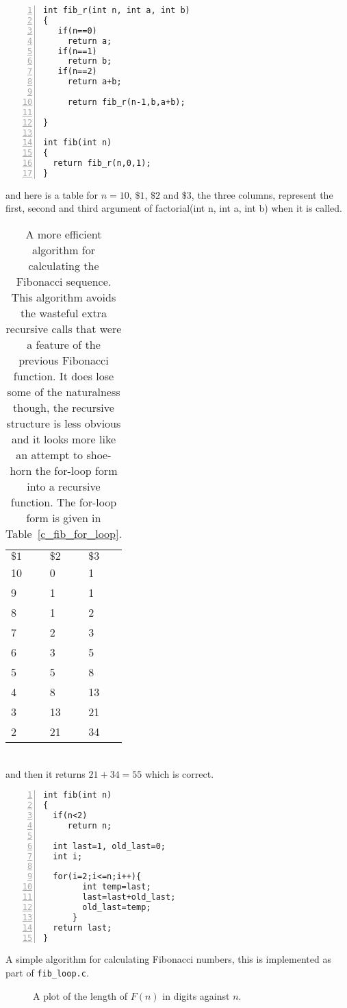 \documentclass[11pt,a4paper]{scrartcl}
\begin{document}
\begin{table}
\begin{lstlisting}[numbers=left]
int fib_r(int n, int a, int b)
{
   if(n==0)
     return a;
   if(n==1)
     return b;
   if(n==2)
     return a+b;
     
     return fib_r(n-1,b,a+b);

}

int fib(int n)
{
  return fib_r(n,0,1);
}
\end{lstlisting}
and here is a table for $n=10$, $\$1$, $\$2$ and $\$3$, the three
columns, represent the first, second and third argument of
factorial(int n, int a, int b) when it is called.\\
\begin{tabular}{l|ll}
$\$1$&$\$2$&$\$3$\\
10&0&1\\
9 &1&1\\
8 &1&2\\
7 &2&3\\
6 &3&5\\
5 &5&8\\
4 &8&13\\
3 &13&21\\
2 &21&34\\
\end{tabular}\\
and then it returns $21+34=55$ which is correct.
\caption{A more efficient algorithm for calculating the Fibonacci
  sequence. This algorithm avoids the wasteful extra recursive calls
  that were a feature of the previous Fibonacci function. It does
  lose some of the naturalness though, the recursive structure is
  less obvious and it looks more like an attempt to shoe-horn the
  for-loop form into a recursive function. The for-loop form is given
  in Table~\ref{c_fib_for_loop}. \label{c_fib_good_recursion}}
\end{table}


\begin{table}
\begin{lstlisting}[numbers=left]
int fib(int n)
{
  if(n<2)
     return n;
  
  int last=1, old_last=0;
  int i;

  for(i=2;i<=n;i++){
        int temp=last;
        last=last+old_last;
        old_last=temp;
      }
  return last;
}
\end{lstlisting}

\caption{A simple algorithm for calculating Fibonacci numbers, this is implemented as part of {\tt fib\_loop.c}. \label{c_fib_for_loop}}
\end{table}


\begin{figure}

\caption{A plot of the length of $F(n)$ in digits against $n$. \label{fig_fib_length}}
\end{figure}
\end{document}
